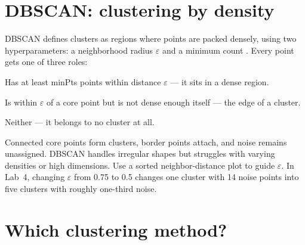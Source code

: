 \section{DBSCAN: clustering by density}
\label{sec:dbscan}

DBSCAN defines clusters as regions where points are packed densely, using two hyperparameters: a neighborhood radius $\varepsilon$ and a minimum count . Every point gets one of three roles:

\begin{description}[leftmargin=1.05in,style=nextline]
  \item[Core point] Has at least minPts points within distance $\varepsilon$ --- it sits in a dense region.
  \item[Border point] Is within $\varepsilon$ of a core point but is not dense enough itself --- the edge of a cluster.
  \item[Noise point] Neither --- it belongs to no cluster at all.
\end{description}

\begin{mlfigure}
\end{mlfigure}

Connected core points form clusters, border points attach, and noise remains unassigned. DBSCAN handles irregular shapes but struggles with varying densities or high dimensions. Use a sorted neighbor-distance plot to guide $\varepsilon$. In Lab~4, changing $\varepsilon$ from 0.75 to 0.5 changes one cluster with 14 noise points into five clusters with roughly one-third noise.

\section{Which clustering method?}

